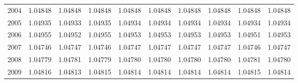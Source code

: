 \begin{tabular}{cccccccccc}
  2004 & 1.04848 & 1.04848 & 1.04848 & 1.04848 & 1.04848 & 1.04848 & 1.04848 & 1.04848 & 1.04848 \\ 
  2005 & 1.04935 & 1.04933 & 1.04935 & 1.04934 & 1.04934 & 1.04934 & 1.04934 & 1.04934 & 1.04934 \\ 
  2006 & 1.04955 & 1.04952 & 1.04955 & 1.04953 & 1.04953 & 1.04953 & 1.04953 & 1.04951 & 1.04953 \\ 
  2007 & 1.04746 & 1.04747 & 1.04746 & 1.04747 & 1.04747 & 1.04747 & 1.04747 & 1.04746 & 1.04747 \\ 
  2008 & 1.04779 & 1.04781 & 1.04779 & 1.04780 & 1.04780 & 1.04780 & 1.04780 & 1.04781 & 1.04780 \\ 
  2009 & 1.04816 & 1.04813 & 1.04815 & 1.04814 & 1.04814 & 1.04814 & 1.04814 & 1.04815 & 1.04814 \\ 
   \hline
\end{tabular}

